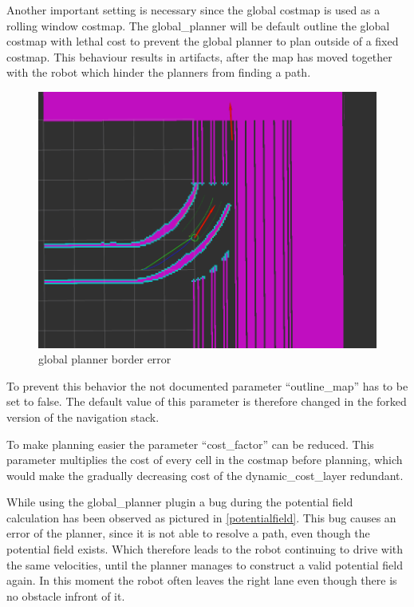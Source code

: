 Another important setting is necessary since the global costmap is used as a rolling window costmap. The global\_planner will be default outline the global costmap with lethal cost to prevent the global planner to plan outside of a fixed costmap. This behaviour results in artifacts, after the map has moved together with the robot which hinder the planners from finding a path.

\begin{figure}[H]
	\centering
	\includegraphics[width=\textwidth]{Pictures/borders}
	
	\caption{global planner border error}
	\label{boardererror}
\end{figure}

To prevent this behavior the not documented parameter ``outline\_map'' has to be set to false. The default value of this parameter is therefore changed in the forked version of the navigation stack.

To make planning easier the parameter ``cost\_factor'' can be reduced. This parameter multiplies the cost of every cell in the costmap before planning, which
 would make the gradually decreasing cost of the dynamic\_cost\_layer redundant.
 
 
 While using the global\_planner plugin a bug during the potential field calculation has been observed as pictured in \ref{potentialfield}. This bug causes an error of the planner, since it is not able to resolve a path, even though the potential field exists. Which therefore leads to the robot continuing to drive with the same velocities,  until the planner manages to construct a valid potential field again. In this moment the robot often leaves the right lane even though there is no obstacle infront of it.
 
